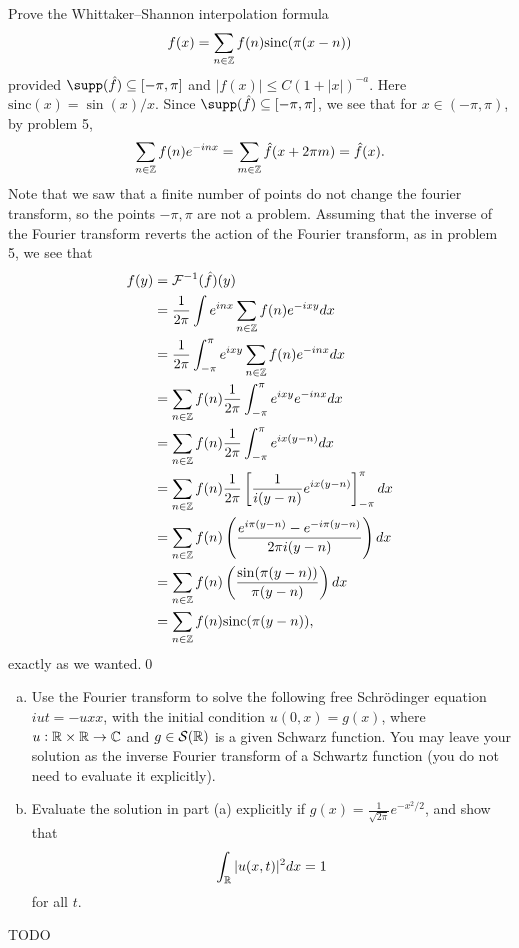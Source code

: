 \documentclass{article}
\begin{document}
\newpage
{} Prove the Whittaker–Shannon interpolation formula
\[f(x) = \sum_{n\in \mathbb{Z}}
f(n)\text{sinc}(\pi(x -n))\]
provided $\supp(\hat{f}) \sse [-\pi,\pi]$ and $|f(x)|\le C(1 + |x|)^{-a}$. Here $\text{sinc}(x) = \sin(x)/x$.  \tri
\hop 
\solution
Since $\supp(\hat{f}) \sse [-\pi, \pi]$, we see that for $x \in (-\pi,\pi)$, by problem 5,
\begin{align*}
    \sum_{n \in \mathbb{Z}}f(n) e^{-inx} = \sum_{m \in \mathbb{Z}} \hat{f}(x + 2\pi m) = \hat{f}(x).
\end{align*}
Note that we saw that a finite number of points do not change the fourier transform, so the points $-\pi, \pi$ are not a problem. Assuming that the inverse of the Fourier transform reverts the action of the Fourier transform, as in problem 5, we see that 
\begin{align*}
    f(y) &= \cal{F}\inv(\hat{f})(y) \\
    &= \frac{1}{2\pi}\int e^{inx}\sum_{n\in \ZZ} f(n)e^{-ixy}dx \\
    &= \frac{1}{2\pi}\int_{-\pi}^\pi e^{ixy}\sum_{n\in \ZZ} f(n)e^{-inx}dx \\
    &=\sum_{n\in \ZZ} f(n) \frac{1}{2\pi}\int_{-\pi}^\pi e^{ixy}e^{-inx}dx \\
    &=\sum_{n\in \ZZ} f(n) \frac{1}{2\pi}\int_{-\pi}^\pi e^{ix(y-n)}dx \\
    &=\sum_{n\in \ZZ} f(n) \frac{1}{2\pi}\sbr{\frac{1}{i(y-n)}e^{ix(y-n)}}_{-\pi}^\pi dx \\
    &=\sum_{n\in \ZZ} f(n) \del{\frac{e^{i\pi(y-n)}-e^{-i\pi(y-n)}}{2\pi i(y-n)}} dx\\
    &=\sum_{n\in \ZZ} f(n) \del{\frac{\sin(\pi(y-n))}{\pi (y-n)}} dx\\
    &=\sum_{n\in \ZZ} f(n) \text{sinc}(\pi(y-n)),\\
\end{align*}
exactly as we wanted.\qed



\newpage
{} 
\begin{enumerate}[(a)]
    \item Use the Fourier transform to solve the following free Schr\" odinger equation $iut = -uxx$,
    with the initial condition $u(0,x) = g(x)$, where $u : \mathbb{R}\times \mathbb{R} \to \mathbb{C}$ and $g \in \mathcal{S}(\mathbb{R})$ is a given Schwarz function.
    You may leave your solution as the inverse Fourier transform of a Schwartz function (you do not need
    to evaluate it explicitly).
    \item  Evaluate the solution in part (a) explicitly if $g(x) = \frac{1}{\sqrt{2\pi}} e^{-x^2/
    2}$, and show that 
    \[\int_{\mathbb{R}}|u(x,t)|^2dx = 1\] for
    all $t$.
\end{enumerate}
\tri
\hop 
\solution
TODO
\end{document}
